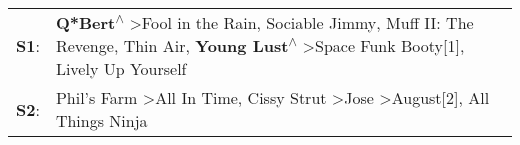 \begin{supertabular}{p{0.03\textwidth}p{0.92\textwidth}}
 \textbf{S1}:  &  \textbf{Q*Bert\textsuperscript{$\wedge$}} \textgreater \enspace Fool in the Rain\textsuperscript{}, \enspace Sociable Jimmy\textsuperscript{}, \enspace Muff II: The Revenge\textsuperscript{}, \enspace Thin Air\textsuperscript{}, \enspace \textbf{Young Lust\textsuperscript{$\wedge$}} \textgreater \enspace Space Funk Booty[1]\textsuperscript{}, \enspace Lively Up Yourself\textsuperscript{}  \enspace  \\
 \textbf{S2}:  &                                                                                                                                   Phil's Farm\textsuperscript{} \textgreater \enspace All In Time\textsuperscript{}, \enspace Cissy Strut\textsuperscript{} \textgreater \enspace Jose\textsuperscript{} \textgreater \enspace August[2]\textsuperscript{}, \enspace All Things Ninja\textsuperscript{}  \enspace  \\
\end{supertabular}
